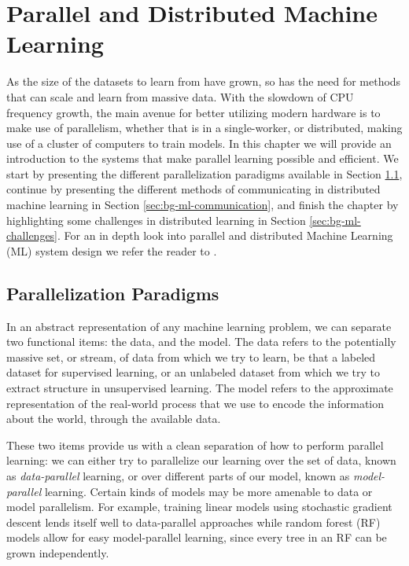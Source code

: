\chapter{Parallel and Distributed Machine Learning}
\label{ch:bg-parallel-ml}

As the size of the datasets to learn from have grown, so has the need for methods that
can scale and learn from massive data. With the slowdown of CPU frequency
growth, the main avenue for better utilizing modern hardware is to make use
of parallelism, whether that is in a single-worker, or distributed,
making use of a cluster of computers to train models. In this chapter we
will provide an introduction to the systems that make
parallel learning possible and efficient. We start by presenting the
different parallelization paradigms available in Section \ref{sec:bg-ml-paradigms},
continue by presenting the different methods of communicating in
distributed machine learning in Section \ref{sec:bg-ml-communication},
and finish the chapter by highlighting some challenges in
distributed learning in Section \ref{sec:bg-ml-challenges}.
For an in depth look into parallel and distributed Machine Learning (ML)
system design we refer the reader to \cite{distributed-ml-design}.

\section{Parallelization Paradigms}
\label{sec:bg-ml-paradigms}

In an abstract representation of any machine learning problem, we can separate
two functional items: the data, and the model. The data refers to the potentially
massive set, or stream, of data from which we try to learn, be that a labeled dataset for
supervised learning, or an unlabeled dataset from which we try to extract
structure in unsupervised learning. The model refers to the approximate representation
of the real-world process that we use to encode the information about the world,
through the available data.

These two items provide us with a clean separation of how to perform
parallel learning: we can either try to parallelize our learning over the set
of data, known as \emph{data-parallel} learning, or over different parts of
our model, known as \emph{model-parallel} learning. Certain kinds of models
may be more amenable to data or model parallelism. For example, training
linear models using stochastic gradient descent lends itself well to
data-parallel approaches \cite{dekel-optimal-distributed} while random
forest (RF) models allow for easy model-parallel learning,
since every tree in an RF can be grown independently.

